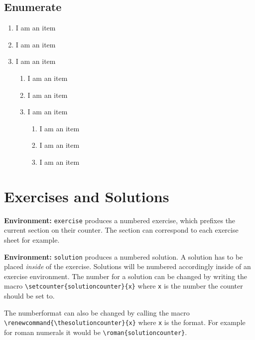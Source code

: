 \documentclass[10pt]{article}
\newcommand{\environmentcmd}[1]{\par\noindent\textbf{Environment:} \lstinline^#1^}
\begin{document}
\subsection{Enumerate}
\begin{enumerate}
  \item I am an item
  \item I am an item
  \item I am an item
        \begin{enumerate}
          \item I am an item
          \item I am an item
          \item I am an item
                \begin{enumerate}
                  \item I am an item
                  \item I am an item
                  \item I am an item
                \end{enumerate}
        \end{enumerate}
\end{enumerate}

\newpage
\section{Exercises and Solutions}
\environmentcmd{exercise} produces a numbered exercise, which prefixes the current section on their counter. The section can correspond to each exercise sheet for example.

\environmentcmd{solution} produces a numbered solution. A solution has to be placed \emph{inside} of the exercise. Solutions will be numbered accordingly inside of an exercise environment. The number for a solution can be changed by writing the macro \lstinline^\setcounter{solutioncounter}{x}^ where \lstinline^x^ is the number the counter should be set to.

The numberformat can also be changed by calling the macro \lstinline^\renewcommand{\thesolutioncounter}{x}^ where \lstinline^x^ is the format. For example for roman numerals it would be \lstinline^\roman{solutioncounter}^.

\begin{exercise}
  \lipsum[1-1]
  \begin{solution}
    \lipsum[1-1]
  \end{solution}
  \begin{solution}
    \lipsum[1-1]
  \end{solution}
  \begin{solution}
    \lipsum[1-1]
  \end{solution}
\end{exercise}
\end{document}

